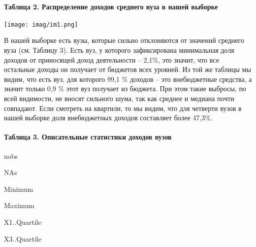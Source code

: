 \documentclass[]{book}
\let\oldparagraph\paragraph
\renewcommand{\paragraph}[1]{\oldparagraph{#1}\mbox{}}
\begin{document}
\hypertarget{ux442ux430ux431ux43bux438ux446ux430-2.-ux440ux430ux441ux43fux440ux435ux434ux435ux43bux435ux43dux438ux435-ux434ux43eux445ux43eux434ux43eux432-ux441ux440ux435ux434ux43dux435ux433ux43e-ux432ux443ux437ux430-ux432-ux43dux430ux448ux435ux439-ux432ux44bux431ux43eux440ux43aux435}{%
\paragraph{Таблица 2. Распределение доходов среднего вуза в нашей выборке}\label{ux442ux430ux431ux43bux438ux446ux430-2.-ux440ux430ux441ux43fux440ux435ux434ux435ux43bux435ux43dux438ux435-ux434ux43eux445ux43eux434ux43eux432-ux441ux440ux435ux434ux43dux435ux433ux43e-ux432ux443ux437ux430-ux432-ux43dux430ux448ux435ux439-ux432ux44bux431ux43eux440ux43aux435}}

\texttt{[image: imag/im1.png]}

В нашей выборке есть вузы, которые сильно отклоняются от значений среднего вуза (см. Таблицу 3). Есть вуз, у которого зафиксирована минимальная доля доходов от приносящей доход деятельности -- 2,1\%, это значит, что все остальные доходы он получает от бюджетов всех уровней. Из той же таблицы мы видим, что есть вуз, для которого 99,1 \% доходов -- это внебюджетные средства, а значит только 0,9 \% этот вуз получает из бюджета. При этом такие выбросы, по всей видимости, не вносят сильного шума, так как среднее и медиана почти совпадают. Если смотреть на квартили, то мы видим, что для четверти вузов в нашей выборке доля внебюджетных доходов составляет более 47,3\%.

\hypertarget{ux442ux430ux431ux43bux438ux446ux430-3.-ux43eux43fux438ux441ux430ux442ux435ux43bux44cux43dux44bux435-ux441ux442ux430ux442ux438ux441ux442ux438ux43aux438-ux434ux43eux445ux43eux434ux43eux432-ux432ux443ux437ux43eux432}{%
\paragraph{Таблица 3. Описательные статистики доходов вузов}\label{ux442ux430ux431ux43bux438ux446ux430-3.-ux43eux43fux438ux441ux430ux442ux435ux43bux44cux43dux44bux435-ux441ux442ux430ux442ux438ux441ux442ux438ux43aux438-ux434ux43eux445ux43eux434ux43eux432-ux432ux443ux437ux43eux432}}

nobs

NAs

Minimum

Maximum

X1..Quartile

X3..Quartile
\end{document}
